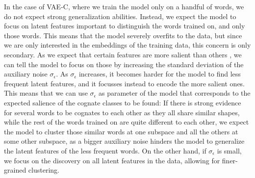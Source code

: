 \documentclass[6pt]{article}
\begin{document}
In the case of VAE-C, where we train the model only on a handful of words, we do not expect strong generalization abilities. Instead, we expect the model to focus on latent features important to distinguish the words trained on, and only those words. This means that the model severely overfits to the data, but since we are only interested in the embeddings of the training data, this concern is only secondary. As we expect that certain features are more salient than others , we can tell the model to focus on those by increasing the standard deviation of the auxiliary noise $\sigma_{\epsilon}$. As $\sigma_{\epsilon}$ increases, it becomes harder for the model to find less frequent latent features, and it focusses instead to encode the more salient ones. This means that we can use $\sigma_{\epsilon}$ as parameter of the model that corresponds to the expected salience of the cognate classes to be found: If there is strong evidence for several words to be cognates to each other as they all share similar shapes, while the rest of the words trained on are quite different to each other, we expect the model to cluster those similar words at one subspace and all the others at some other subspace, as a bigger auxiliary noise hinders the model to generalize the latent features of the less frequent words. On the other hand, if  $\sigma_{\epsilon}$  is small, we focus on the discovery on all latent features in the data, allowing for finer-grained clustering.  
\end{document}
